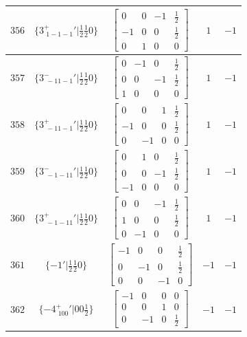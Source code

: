 \documentclass[fleqn,8pt]{jsarticle}
\begin{document}
\begin{longtable}{ccccc}
$ 356 $ & $ \{3^{+}_{\,\,1-1-1}{}'|\frac{1}{2} \frac{1}{2} 0\} $ & $ \begin{bmatrix} 0 & 0 & -1 & \frac{1}{2} \\ -1 & 0 & 0 & \frac{1}{2} \\ 0 & 1 & 0 & 0 \end{bmatrix} $ & $ 1 $ & $ -1 $ \\ \hline
$ 357 $ & $ \{3^{-}_{\,\,-11-1}{}'|\frac{1}{2} \frac{1}{2} 0\} $ & $ \begin{bmatrix} 0 & -1 & 0 & \frac{1}{2} \\ 0 & 0 & -1 & \frac{1}{2} \\ 1 & 0 & 0 & 0 \end{bmatrix} $ & $ 1 $ & $ -1 $ \\ \hline
$ 358 $ & $ \{3^{+}_{\,\,-11-1}{}'|\frac{1}{2} \frac{1}{2} 0\} $ & $ \begin{bmatrix} 0 & 0 & 1 & \frac{1}{2} \\ -1 & 0 & 0 & \frac{1}{2} \\ 0 & -1 & 0 & 0 \end{bmatrix} $ & $ 1 $ & $ -1 $ \\ \hline
$ 359 $ & $ \{3^{-}_{\,\,-1-11}{}'|\frac{1}{2} \frac{1}{2} 0\} $ & $ \begin{bmatrix} 0 & 1 & 0 & \frac{1}{2} \\ 0 & 0 & -1 & \frac{1}{2} \\ -1 & 0 & 0 & 0 \end{bmatrix} $ & $ 1 $ & $ -1 $ \\ \hline
$ 360 $ & $ \{3^{+}_{\,\,-1-11}{}'|\frac{1}{2} \frac{1}{2} 0\} $ & $ \begin{bmatrix} 0 & 0 & -1 & \frac{1}{2} \\ 1 & 0 & 0 & \frac{1}{2} \\ 0 & -1 & 0 & 0 \end{bmatrix} $ & $ 1 $ & $ -1 $ \\ \hline
$ 361 $ & $ \{-1{}'|\frac{1}{2} \frac{1}{2} 0\} $ & $ \begin{bmatrix} -1 & 0 & 0 & \frac{1}{2} \\ 0 & -1 & 0 & \frac{1}{2} \\ 0 & 0 & -1 & 0 \end{bmatrix} $ & $ -1 $ & $ -1 $ \\ \hline
$ 362 $ & $ \{-4^{+}_{\,\,100}{}'|0 0 \frac{1}{2}\} $ & $ \begin{bmatrix} -1 & 0 & 0 & 0 \\ 0 & 0 & 1 & 0 \\ 0 & -1 & 0 & \frac{1}{2} \end{bmatrix} $ & $ -1 $ & $ -1 $ \\ \hline

\end{longtable}
\end{document}

